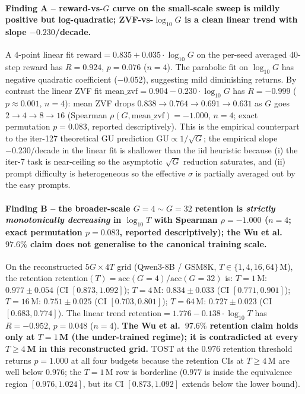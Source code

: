 \paragraph{Finding A -- reward-vs-$G$ curve on the small-scale sweep
is mildly positive but log-quadratic; ZVF-vs-$\log_{10}G$ is a clean
linear trend with slope $-0.230$/decade.}
A 4-point linear fit
$\mathrm{reward} = 0.835 + 0.035 \cdot \log_{10}G$ on the per-seed
averaged 40-step reward has $R{=}0.924$, $p{=}0.076$ ($n{=}4$). The
parabolic fit on $\log_{10}G$ has negative quadratic coefficient
($-0.052$), suggesting mild diminishing returns. By contrast the
linear ZVF fit
$\mathrm{mean\_zvf} = 0.904 - 0.230 \cdot \log_{10}G$
has $R{=}{-}0.999$ ($p \approx 0.001$, $n{=}4$): mean ZVF drops
$0.838 \to 0.764 \to 0.691 \to 0.631$ as $G$ goes $2 \to 4 \to 8 \to 16$
(Spearman $\rho(G, \mathrm{mean\_zvf}) = -1.000$, $n{=}4$; exact
permutation $p{=}0.083$, reported descriptively).
This is the empirical counterpart to the iter-127 theoretical GU
prediction $\mathrm{GU} \propto 1/\sqrt{G}$; the empirical slope
$-0.230$/decade in the linear fit is shallower than the iid heuristic
because (i) the iter-7 task is near-ceiling so the asymptotic
$\sqrt{G}$ reduction saturates, and (ii) prompt difficulty is
heterogeneous so the effective $\sigma$ is partially averaged out by
the easy prompts.

\paragraph{Finding B -- the broader-scale $G{=}4{\sim}G{=}32$
retention is \emph{strictly monotonically decreasing} in $\log_{10}T$
with Spearman $\rho = -1.000$ ($n{=}4$; exact permutation $p{=}0.083$,
reported descriptively); the Wu et
al.\ $97.6\%$ claim does not generalise to the canonical training
scale.}
On the reconstructed $5G \times 4T$ grid (Qwen3-8B / GSM8K,
$T \in \{1, 4, 16, 64\}\,$M),
the retention
$\mathrm{retention}(T) = \mathrm{acc}(G{=}4) / \mathrm{acc}(G{=}32)$
is:
$T{=}1\,$M: $0.977 \pm 0.054$ (CI $[0.873, 1.092]$);
$T{=}4\,$M: $0.834 \pm 0.033$ (CI $[0.771, 0.901]$);
$T{=}16\,$M: $0.751 \pm 0.025$ (CI $[0.703, 0.801]$);
$T{=}64\,$M: $0.727 \pm 0.023$ (CI $[0.683, 0.774]$).
The linear trend $\mathrm{retention} = 1.776 - 0.138 \cdot \log_{10}T$
has $R{=}{-}0.952$, $p{=}0.048$ ($n{=}4$). \textbf{The Wu et al.\
$97.6\%$ retention claim holds only at $T{=}1\,$M (the under-trained
regime); it is contradicted at every $T \ge 4\,$M in this reconstructed grid.}
TOST at the $0.976$ retention threshold returns $p{=}1.000$ at all
four budgets because the retention CIs at $T \ge 4\,$M are well below
$0.976$; the $T{=}1\,$M row is borderline ($0.977$ is inside the
equivalence region $[0.976, 1.024]$, but its CI $[0.873, 1.092]$
extends below the lower bound).

